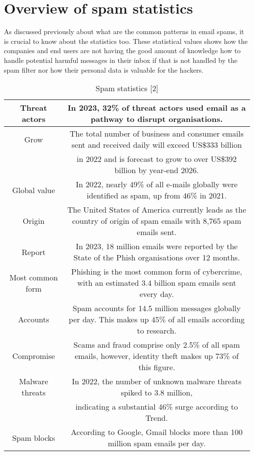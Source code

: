 ﻿\section{Overview of spam statistics}
As discussed previously about what are the common patterns in email spams, it is crucial to know about the statistics too.
These statistical values shows how the companies and end users are not having the good amount of knowledge how to handle potential harmful messages in their inbox if that is not handled by the spam filter nor how their personal data is valuable for the hackers.

\begin{table*}
    \caption{Spam statistics [2]}
    \label{spam_stats}
    \centering
    \begin{tabular}{| c | c |}
    \hline
    Threat actors & In 2023, 32\% of threat actors used email as a pathway to disrupt organisations. \\ 
    \hline
    Grow & The total number of business and consumer emails sent and received daily will exceed US\$333 billion \\
     & in 2022 and is forecast to grow to over US\$392 billion by year-end 2026.  \\ 
    \hline
    Global value       & In 2022, nearly 49\% of all e-mails globally were identified as spam, up from 46\% in 2021.  \\ 
    \hline
    Origin        & The United States of America currently leads as the country of origin of spam emails with 8,765 spam emails sent.  \\ 
    \hline
    Report       & In 2023, 18 million emails were reported by the State of the Phish organisations over 12 months.  \\ 
    \hline
    Most common form        & Phishing is the most common form of cybercrime, with an estimated 3.4 billion spam emails sent every day.  \\ 
    \hline
    Accounts       & Spam accounts for 14.5 million messages globally per day. This makes up 45\% of all emails according to research.  \\ 
    \hline
    Compromise      & Scams and fraud comprise only 2.5\% of all spam emails, however, identity theft makes up 73\% of this figure.  \\ 
    \hline
    Malware threats       & In 2022, the number of unknown malware threats spiked to 3.8 million, \\
     & indicating a substantial 46\% surge according to Trend. \\ 
    \hline
    Spam blocks      & According to Google, Gmail blocks more than 100 million spam emails per day.  \\ 
    \hline
    \end{tabular}
\end{table*}